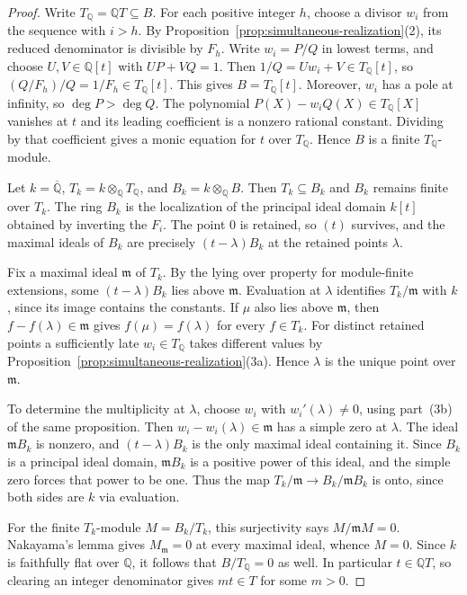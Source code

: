 \documentclass{article}
\theoremstyle{remark}
\begin{document}
\begin{proof}
    Write $T_{\mathbb{Q}} = \mathbb{Q}T \subseteq B$.
    For each positive integer $h$, choose a divisor $w_i$ from the sequence with $i > h$.
    By Proposition~\ref{prop:simultaneous-realization}(2), its reduced denominator is divisible by $F_h$.
    Write $w_i = P/Q$ in lowest terms, and choose $U, V \in \mathbb{Q}[t]$ with $UP + VQ = 1$.
    Then $1/Q = Uw_i + V \in T_{\mathbb{Q}}[t]$, so $(Q/F_h)/Q = 1/F_h \in T_{\mathbb{Q}}[t]$.
    This gives $B = T_{\mathbb{Q}}[t]$.
    Moreover, $w_i$ has a pole at infinity, so $\deg P > \deg Q$.
    The polynomial $P(X) - w_i Q(X) \in T_{\mathbb{Q}}[X]$ vanishes at $t$ and its leading coefficient is a nonzero rational constant.
    Dividing by that coefficient gives a monic equation for $t$ over $T_{\mathbb{Q}}$.
    Hence $B$ is a finite $T_{\mathbb{Q}}$-module.

    Let $k = \overline{\mathbb{Q}}$, $T_k = k \otimes_{\mathbb{Q}} T_{\mathbb{Q}}$, and $B_k = k \otimes_{\mathbb{Q}} B$.
    Then $T_k \subseteq B_k$ and $B_k$ remains finite over $T_k$.
    The ring $B_k$ is the localization of the principal ideal domain $k[t]$ obtained by inverting the $F_i$.
    The point $0$ is retained, so $(t)$ survives, and the maximal ideals of $B_k$ are precisely $(t - \lambda)B_k$ at the retained points $\lambda$.

    Fix a maximal ideal $\mathfrak{m}$ of $T_k$.
    By the lying over property for module-finite extensions, some $(t - \lambda)B_k$ lies above $\mathfrak{m}$.
    Evaluation at $\lambda$ identifies $T_k/\mathfrak{m}$ with $k$, since its image contains the constants.
    If $\mu$ also lies above $\mathfrak{m}$, then $f - f(\lambda) \in \mathfrak{m}$ gives $f(\mu) = f(\lambda)$ for every $f \in T_k$.
    For distinct retained points a sufficiently late $w_i \in T_{\mathbb{Q}}$ takes different values by Proposition~\ref{prop:simultaneous-realization}(3a).
    Hence $\lambda$ is the unique point over $\mathfrak{m}$.

    To determine the multiplicity at $\lambda$, choose $w_i$ with $w_i'(\lambda) \ne 0$, using part~(3b) of the same proposition.
    Then $w_i - w_i(\lambda) \in \mathfrak{m}$ has a simple zero at $\lambda$.
    The ideal $\mathfrak{m}B_k$ is nonzero, and $(t - \lambda)B_k$ is the only maximal ideal containing it.
    Since $B_k$ is a principal ideal domain, $\mathfrak{m}B_k$ is a positive power of this ideal, and the simple zero forces that power to be one.
    Thus the map $T_k/\mathfrak{m} \to B_k/\mathfrak{m}B_k$ is onto, since both sides are $k$ via evaluation.

    For the finite $T_k$-module $M = B_k/T_k$, this surjectivity says $M/\mathfrak{m}M = 0$.
    Nakayama's lemma gives $M_{\mathfrak{m}} = 0$ at every maximal ideal, whence $M = 0$.
    Since $k$ is faithfully flat over $\mathbb{Q}$, it follows that $B/T_{\mathbb{Q}} = 0$ as well.
    In particular $t \in \mathbb{Q}T$, so clearing an integer denominator gives $mt \in T$ for some $m > 0$.
\end{proof}
\end{document}
